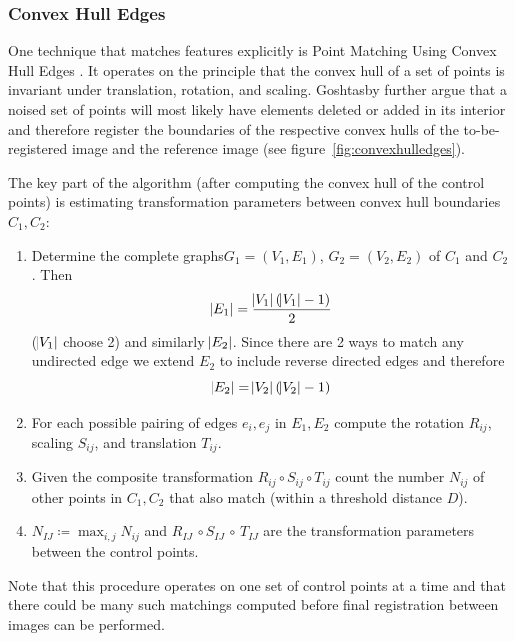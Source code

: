 \subsubsection{Convex Hull Edges}
%
One technique that matches features explicitly is Point Matching Using Convex Hull Edges \cite{Goshtasby1985}.
%
It operates on the principle that the convex hull of a set of points is invariant under translation, rotation, and scaling.
%
Goshtasby \etal further argue that a noised set of points will most likely have elements deleted or added in its interior and therefore register the boundaries of the respective convex hulls of the to-be-registered image and the reference image (see figure~\ref{fig:convexhulledges}).
%

The key part of the algorithm (after computing the convex hull of the control points) is estimating transformation parameters between convex hull boundaries \(C_1, C_2\):
%
\begin{framed}
	\begin{enumerate}
		\item Determine the complete graphs\footnotemark \(G_1=(V_1, E_1)\), \(G_2 = (V_2,E_2)\) of \(C_1\) and \(C_2\). Then \[\abs{E_1} = \frac{\abs{V_1} (\abs{V_1}-1)}{2}\] (\(\abs{V_1}\) choose 2) and similarly \(\abs{E_2}\). Since there are 2 ways to match any undirected edge we extend \(E_2\) to include reverse directed edges and therefore \[\abs{E_2} = \abs{V_2} (\abs{V_2}-1)\]
		\item For each possible pairing of edges \(e_i, e_j\) in \(E_1, E_2\) compute the rotation \(R_{ij}\), scaling \(S_{ij}\), and translation \(T_{ij}\).
		\item Given the composite transformation \(R_{ij} \circ S_{ij} \circ T_{ij}\) count the number \(N_{ij}\) of other points in \(C_1, C_2\) that also match (within a threshold distance \(D\)).
		\item \(N_{IJ} \coloneqq \max_{i,j} N_{ij}\) and \(R_{IJ}\, \circ S_{IJ}\, \circ\, T_{IJ}\) are the transformation parameters between the control points.
	\end{enumerate}
\end{framed}
\addtocounter{footnote}{-1}
{
	\makeatletter
	\renewcommand\@makefnmark{\hbox{\@textsuperscript{\normalfont\color{white}\@thefnmark}}}
	\renewcommand\@makefntext[1]{%
	  \parindent 1em\noindent
				\hb@xt@1.8em{%
					\hss\@textsuperscript{\normalfont\@thefnmark}}#1}
	\makeatother

}
%
Note that this procedure operates on one set of control points at a time and that there could be many such matchings computed before final registration between images can be performed.

